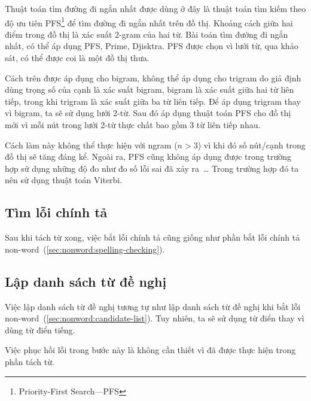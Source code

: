 \documentclass[a4paper,oneside,14pt]{extbook} %
\begin{document}
Thuật toán tìm đường đi ngắn nhất được dùng ở đây là thuật toán tìm
kiếm theo độ ưu tiên PFS\footnote{Priority-First Search---PFS} để tìm
đường đi ngắn nhất trên đồ thị. Khoảng cách giữa hai 
điểm trong đồ thị là xác suất 2-gram của hai từ. Bài toán tìm đường
đi ngắn nhất, có thể áp dụng PFS, Prime, Djisktra. PFS được chọn vì
lưới từ, qua khảo sát, có thể được coi là một đồ thị thưa.

Cách trên được áp dụng cho bigram, không thể áp dụng cho trigram do
giả định dùng trọng số của cạnh là xác suất bigram, bigram là xác suất
giữa hai từ liên tiếp, trong khi trigram là xác suất giữa ba từ liên
tiếp. Để áp dụng trigram thay vì bigram, ta sẽ sử dụng lưới 2-từ. Sau
đó áp dụng thuật toán PFS cho đồ thị mới vì mỗi nút trong lưới 2-từ
thực chất bao gồm 3 từ liên tiếp nhau.

Cách làm này không thể thực hiện với ngram ($n > 3$) vì khi đó số
nút/cạnh trong đồ thị sẽ tăng đáng kể. Ngoài ra, PFS cũng không áp
dụng được trong trường hợp sử dụng những độ đo như đo số lỗi sai đã
xảy ra~\ldots{} Trong trường hợp đó ta nên sử dụng thuật toán
Viterbi.


\subsection{Tìm lỗi chính tả}
\label{sec:realword:spelling-checking}

Sau khi tách từ xong, việc bắt lỗi chính tả cũng giống như phần bắt
lỗi chính tả non-word~(\ref{sec:nonword:spelling-checking}).

\subsection{Lập danh sách từ đề nghị}
\label{sec:realword:candidate-list}

Việc lập danh sách từ đề nghị tương tự như lập danh sách từ đề nghị
khi bắt lỗi non-word~(\ref{sec:nonword:candidate-list}). Tuy nhiên, ta
sẽ sử dụng từ điển thay vì dùng từ điển tiếng.

Việc phục hồi lỗi trong bước này là không cần thiết vì đã được thực
hiện trong phần tách từ.

\end{document}

